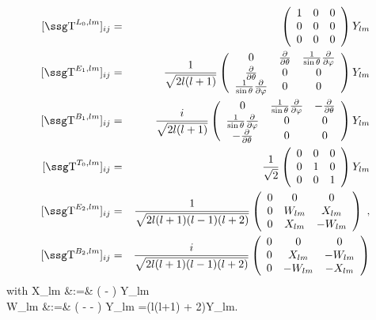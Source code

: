 \begin{eqnarray*}
%
        {}[\w{T}^{L_0, lm}]_{ij} &=&
        \left( \begin{array}{ccc}
        1 & 0 & 0 \\
        0 & 0 & 0 \\
        0 & 0 & 0 \\
        \end{array} \right) Y_{lm} \\ 
%
        {}[\w{T}^{E_1, lm}]_{ij} &=&
        \frac{1}{\sqrt{2l(l+1)}}
        \left( \begin{array}{ccc}
        0 & \df{}{\th} & \frac{1}{\sin\th}\df{}{\ph} \\
        \df{}{\th}& 0 & 0 \\
        \frac{1}{\sin\th}\df{}{\ph} & 0 & 0 \\
        \end{array} \right) Y_{lm} \\ 
%
        {}[\w{T}^{B_1, lm}]_{ij} &=& 
        \frac{i}{\sqrt{2l(l+1)}}
        \left( \begin{array}{ccc}
        0 & \frac{1}{\sin\th} \df{}{\ph} & 
        -\df{}{\th} \\
        \frac{1}{\sin\th} \df{}{\ph} & 0 & 0 \\
        -\df{}{\th} & 0 & 0 \\
        \end{array} \right) Y_{lm} \\ 
%
        {}[\w{T}^{T_0, lm}]_{ij} &=&
        \frac{1}{\sqrt{2}}\left( \begin{array}{ccc}
        0 & 0 & 0 \\
        0 & 1 & 0 \\
        0 & 0 & 1 \\
        \end{array} \right) Y_{lm} \\ 
%
        {}[\w{T}^{E_2, lm}]_{ij} &=&
        \frac{1}{\sqrt{2l(l+1)(l-1)(l+2)}}
        \left( \begin{array}{ccc}
	0 & 0 & 0 \\
        0 & W_{lm} & X_{lm} \\
        0 & X_{lm} & -W_{lm} \\
        \end{array} \right) \;,\\ 
%
        {}[\w{T}^{B_2, lm}]_{ij} &=&
        \frac{i}{\sqrt{2l(l+1)(l-1)(l+2)}}
        \left( \begin{array}{ccc}
        0 & 0 & 0 \\
        0 & X_{lm} & -W_{lm} \\
        0 & -W_{lm} & -X_{lm} \\
        \end{array} \right)  
\end{eqnarray*}
with 
\bea
        X_{lm} &:=& \left(\df{}{\th} -
        \cot\th\right)\df{}{\ph} Y_{lm} \\
        W_{lm} &:=& \left(\dff{}{\th} - \cot\th\df{}{\th}
        - \dff{}{\ph}\right) Y_{lm}
        =\left(l(l+1) + 2\dff{}{\th}\right)Y_{lm}.
\eea

